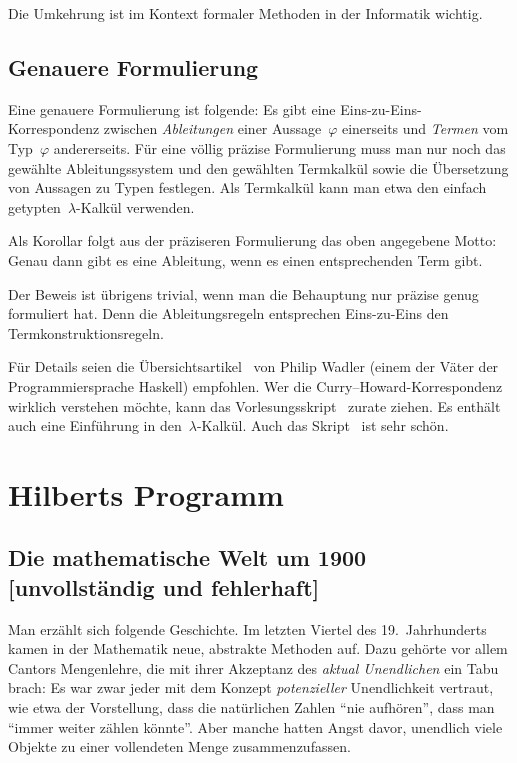 \documentclass[a4paper,ngerman,12pt]{scrartcl}
\theoremstyle{definition}
\theoremstyle{plain}
\theoremstyle{remark}
\renewcommand{\_}{\mathpunct{.}\,}
\newcommand{\?}{\,{:}\,}
\begin{document}
Die Umkehrung ist im Kontext formaler Methoden in der Informatik wichtig.


\subsection{Genauere Formulierung}

Eine genauere Formulierung ist folgende: Es gibt eine Eins-zu-Eins-Korrespondenz
zwischen \emph{Ableitungen} einer Aussage~$\varphi$ einerseits und
\emph{Termen} vom Typ~$\varphi$ andererseits. Für eine völlig präzise
Formulierung muss man nur noch das gewählte Ableitungssystem und den gewählten
Termkalkül sowie die
Übersetzung von Aussagen zu Typen festlegen. Als Termkalkül kann man etwa den
einfach getypten~$\lambda$-Kalkül verwenden.

Als Korollar folgt aus der präziseren Formulierung das oben angegebene Motto:
Genau dann gibt es eine Ableitung, wenn es einen entsprechenden Term gibt.

Der Beweis ist übrigens trivial, wenn man die Behauptung nur präzise genug
formuliert hat. Denn die Ableitungsregeln entsprechen Eins-zu-Eins den
Termkonstruktionsregeln.

Für Details seien die Übersichtsartikel~\cite{wadler:curry-howard1,wadler:curry-howard2} von Philip
Wadler (einem der Väter der Pro\-gram\-mier\-spra\-che Haskell) empfohlen. Wer die
Curry--Howard-Korrespondenz wirklich verstehen möchte, kann das
Vorlesungsskript~\cite{sorensen:urzyczyn:curryhoward} zurate ziehen. Es enthält
auch eine Einführung in den~$\lambda$-Kalkül. Auch das
Skript~\cite{pfenning:constructive-logic} ist sehr schön.


\section{Hilberts Programm}
\label{hilberts-programm}

\subsection[Die mathematische Welt um 1900]{Die mathematische Welt um 1900
\qquad\small[unvollständig und fehlerhaft]}

Man erzählt sich folgende Geschichte. Im letzten Viertel des 19.~Jahrhunderts
kamen in der Mathematik neue, abstrakte Methoden auf. Dazu gehörte vor allem
Cantors Mengenlehre, die mit ihrer Akzeptanz des \emph{aktual Unendlichen} ein
Tabu brach: Es war zwar jeder mit dem Konzept \emph{potenzieller} Unendlichkeit
vertraut, wie etwa der Vorstellung, dass die natürlichen Zahlen "`nie
aufhören"', dass man "`immer weiter zählen könnte"'. Aber manche hatten Angst
davor, unendlich viele Objekte zu einer vollendeten Menge zusammenzufassen.
\end{document}
